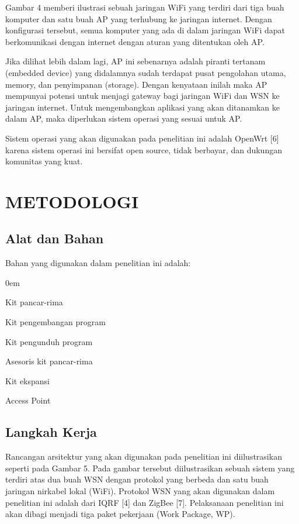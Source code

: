 \documentclass{jtetiproposalskripsi}
\begin{document}
Gambar 4 memberi ilustrasi sebuah jaringan WiFi yang terdiri dari tiga buah komputer dan satu buah AP yang terhubung ke jaringan internet. Dengan konfigurasi tersebut, semua komputer yang ada di dalam jaringan WiFi dapat berkomunikasi dengan internet dengan aturan yang ditentukan oleh AP.

Jika dilihat lebih dalam lagi, AP ini sebenarnya adalah piranti tertanam (embedded device) yang didalamnya sudah terdapat pusat pengolahan utama, memory, dan penyimpanan (storage). Dengan kenyataan inilah maka AP mempunyai potensi untuk menjagi gateway bagi jaringan WiFi dan WSN ke jaringan internet. Untuk mengembangkan aplikasi yang akan ditanamkan ke dalam AP, maka diperlukan sistem operasi yang sesuai untuk AP.

Sistem operasi yang akan digunakan pada penelitian ini adalah OpenWrt [6] karena sistem operasi ini bersifat open source, tidak berbayar, dan dukungan komunitas yang kuat.

\chapter{METODOLOGI}

\section{Alat dan Bahan}
Bahan yang digunakan dalam penelitian ini adalah:

\begin{enumerate}[a.]
\begin{singlespace}
\itemsep0em
\item Kit pancar-rima
\item Kit pengembangan program
\item Kit pengunduh program
\item Asesoris kit pancar-rima
\item Kit ekspansi
\item Access Point
\end{singlespace}
\end{enumerate}


\section{Langkah Kerja}
Rancangan arsitektur yang akan digunakan pada penelitian ini diilustrasikan seperti pada Gambar 5. Pada gambar tersebut diilustrasikan sebuah sistem yang terdiri atas dua buah WSN dengan protokol yang berbeda dan satu buah jaringan nirkabel lokal (WiFi). Protokol WSN yang akan digunakan dalam penelitian ini adalah dari IQRF [4] dan ZigBee [7]. Pelaksanaan penelitian ini akan dibagi menjadi tiga paket pekerjaan (Work Package, WP).
\end{document}
